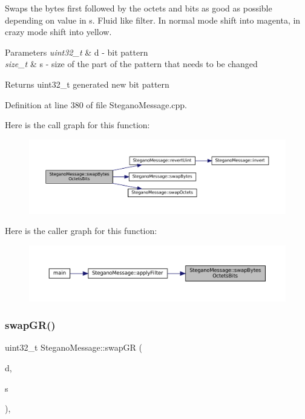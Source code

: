 Swaps the bytes first followed by the octets and bits as good as possible depending on value in s. Fluid like filter. In normal mode shift into magenta, in crazy mode shift into yellow. 


\begin{DoxyParams}{Parameters}
{\em uint32\+\_\+t} & d -\/ bit pattern \\
\hline
{\em size\+\_\+t} & s -\/ size of the part of the pattern that needs to be changed \\
\hline
\end{DoxyParams}
\begin{DoxyReturn}{Returns}
uint32\+\_\+t generated new bit pattern 
\end{DoxyReturn}


Definition at line 380 of file Stegano\+Message.\+cpp.

Here is the call graph for this function\+:
\nopagebreak
\begin{figure}[H]
\begin{center}
\leavevmode
\includegraphics[width=350pt]{classSteganoMessage_ab17fa1a4dc587ae268e400913cc5f0c8_cgraph}
\end{center}
\end{figure}
Here is the caller graph for this function\+:
\nopagebreak
\begin{figure}[H]
\begin{center}
\leavevmode
\includegraphics[width=350pt]{classSteganoMessage_ab17fa1a4dc587ae268e400913cc5f0c8_icgraph}
\end{center}
\end{figure}
\mbox{\label{classSteganoMessage_a7e29a46073f2ef9c6e44bb1d46ad534f}} 
\subsubsection{\texorpdfstring{swapGR()}{swapGR()}}
{\footnotesize\ttfamily uint32\+\_\+t Stegano\+Message\+::swap\+GR (\begin{DoxyParamCaption}\item[{uint32\+\_\+t}]{d,  }\item[{size\+\_\+t}]{s }\end{DoxyParamCaption})\hspace{0.3cm}{\ttfamily [static]}, {\ttfamily [private]}}



